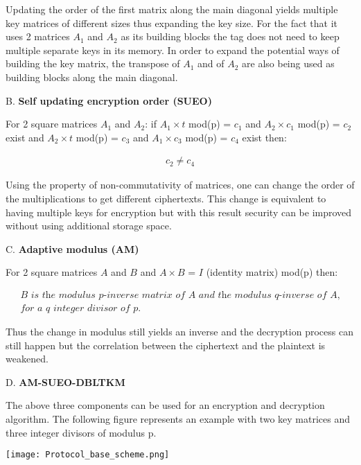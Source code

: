     Updating the order of the first matrix along the main diagonal yields multiple key matrices of different sizes thus expanding the key size. For the fact that 
    it uses 2 matrices $A_1$ and $A_2$ as its building blocks the tag does not need to keep multiple separate keys in its memory. In order to expand the potential
    ways of building the key matrix, the transpose of $A_1$ and  of $A_2$ are also being used as building blocks along the main diagonal.

    B. \textbf{Self updating encryption order (SUEO)}

    For 2 square matrices $A_1$ and $A_2$: if $A_1 \times t$ mod(p) = $c_1$ and $A_2 \times c_1$ mod(p) = $c_2$ exist and $A_2 \times t$ mod(p) = $c_3$ and 
    $A_1 \times c_3$ mod(p) = $c_4$ exist then: 
    
    \begin{gather*}
        c_2 \neq c_4
    \end{gather*}

    Using the property of non-commutativity of matrices, one can change the order of the multiplications to get different ciphertexts. This change is equivalent to having multiple keys for
    encryption but with this result security can be improved without using additional storage space.

    C. \textbf{Adaptive modulus (AM)}

    For 2 square matrices $A$ and $B$ and $A \times B$ = $I$ (identity matrix) mod(p) then: 
    
    \begin{gather*}
        \textit{B is the modulus p-inverse matrix of A and the modulus q-inverse of A,}\\
        \textit{for a q integer divisor of p.}
    \end{gather*}

    Thus the change in modulus still yields an inverse and the decryption process can still happen but the correlation between the ciphertext and the plaintext is weakened.

    D. \textbf{AM-SUEO-DBLTKM}

    The above three components can be used for an encryption and decryption algorithm. The following figure represents an example with two key matrices and three
    integer divisors of modulus p.

    \begin{center}
    \texttt{[image: Protocol\_base\_scheme.png]}
    \end{center}

